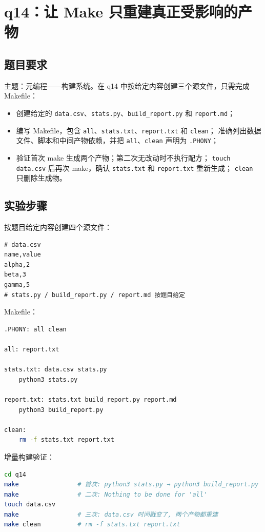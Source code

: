 \documentclass[a4paper,11pt]{ctexart}
\begin{document}
\section{q14：让 Make 只重建真正受影响的产物}

\subsection{题目要求}

主题：元编程——构建系统。在 q14 中按给定内容创建三个源文件，只需完成 Makefile：
\begin{itemize}
  \item 创建给定的 \texttt{data.csv}、\texttt{stats.py}、\texttt{build\_report.py} 和 \texttt{report.md}；
  \item 编写 Makefile，包含 \texttt{all}、\texttt{stats.txt}、\texttt{report.txt} 和 \texttt{clean}；
        准确列出数据文件、脚本和中间产物依赖，并把 \texttt{all}、\texttt{clean} 声明为 \texttt{.PHONY}；
  \item 验证首次 make 生成两个产物；第二次无改动时不执行配方；
        \texttt{touch data.csv} 后再次 make，确认 \texttt{stats.txt} 和 \texttt{report.txt} 重新生成；
        \texttt{clean} 只删除生成物。
\end{itemize}

\subsection{实验步骤}

按题目给定内容创建四个源文件：

\begin{lstlisting}
# data.csv
name,value
alpha,2
beta,3
gamma,5
# stats.py / build_report.py / report.md 按题目给定
\end{lstlisting}

Makefile：

\begin{lstlisting}[language=bash]
.PHONY: all clean

all: report.txt

stats.txt: data.csv stats.py
	python3 stats.py

report.txt: stats.txt build_report.py report.md
	python3 build_report.py

clean:
	rm -f stats.txt report.txt
\end{lstlisting}

增量构建验证：

\begin{lstlisting}[language=bash]
cd q14
make                # 首次: python3 stats.py → python3 build_report.py
make                # 二次: Nothing to be done for 'all'
touch data.csv
make                # 三次: data.csv 时间戳变了, 两个产物都重建
make clean          # rm -f stats.txt report.txt
\end{lstlisting}
\end{document}
